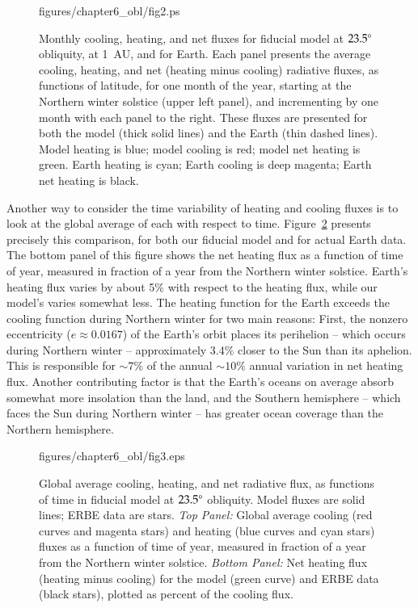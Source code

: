 \afterpage{\clearpage}

\begin{figure}[p]
\plotone
{figures/chapter6_obl/fig2.ps}
\caption[Monthly cooling, heating, and net fluxes for fiducial model
at $23.5\degr$ obliquity, at 1~AU, and for Earth.]{Monthly cooling,
heating, and net fluxes for fiducial model at $23.5\degr$ obliquity,
at 1~AU, and for Earth.  Each panel presents the average cooling,
heating, and net (heating minus cooling) radiative fluxes, as
functions of latitude, for one month of the year, starting at the
Northern winter solstice (upper left panel), and incrementing by one
month with each panel to the right.  These fluxes are presented for
both the model (thick solid lines) and the Earth (thin dashed lines).
Model heating is blue; model cooling is red; model net heating is
green.  Earth heating is cyan; Earth cooling is deep magenta; Earth net
heating is black.}
\label{obl_fig:set30heat_cool_monthly23}
\end{figure}

\afterpage{\clearpage}

Another way to consider the time variability of heating and cooling
fluxes is to look at the global average of each with respect to time.
Figure~\ref{obl_fig:set30_heat_cool_vs_time} presents precisely this
comparison, for both our fiducial model and for actual Earth data.
The bottom panel of this figure shows the net heating flux as a
function of time of year, measured in fraction of a year from the
Northern winter solstice.  Earth's heating flux varies by about 5\%
with respect to the heating flux, while our model's varies somewhat
less.  The heating function for the Earth exceeds the cooling function
during Northern winter for two main reasons: First, the nonzero
eccentricity ($e\approx 0.0167$) of the Earth's orbit places its
perihelion -- which occurs during Northern winter -- approximately
3.4\% closer to the Sun than its aphelion.  This is responsible for
$\sim 7\%$ of the annual $\sim 10\%$ annual variation in net heating
flux.  Another contributing factor is that the Earth's oceans on
average absorb somewhat more insolation than the land, and the
Southern hemisphere -- which faces the Sun during Northern winter --
has greater ocean coverage than the Northern hemisphere.

\begin{figure}[p]
\plotone
{figures/chapter6_obl/fig3.eps}
\caption[Global average cooling, heating, and net radiative flux, as
functions of time in fiducial model at $23.5\degr$ obliquity.]{Global
average cooling, heating, and net radiative flux, as functions of time
in fiducial model at $23.5\degr$ obliquity.  Model fluxes are solid
lines; ERBE data are stars. {\it Top Panel:} Global average cooling
(red curves and magenta stars) and heating (blue curves and cyan
stars) fluxes as a function of time of year, measured in fraction of a
year from the Northern winter solstice.  {\it Bottom Panel:} Net
heating flux (heating minus cooling) for the model (green curve) and
ERBE data (black stars), plotted as percent of the cooling flux.}
\label{obl_fig:set30_heat_cool_vs_time}
\end{figure}

